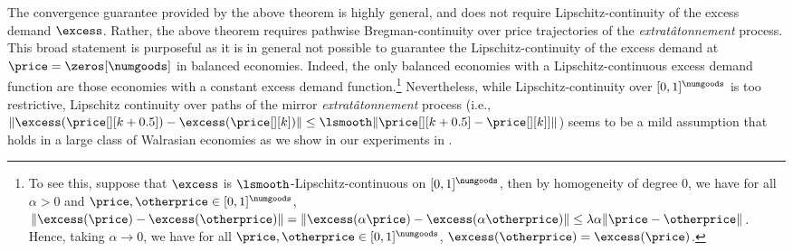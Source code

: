 The convergence guarantee provided by the above theorem is highly general, and does not require Lipschitz-continuity of the excess demand $\excess$. Rather, the above theorem requires pathwise Bregman-continuity over price trajectories of the \emph{extrat\^atonnement} process. This broad statement is purposeful as it is in general not possible to guarantee the Lipschitz-continuity of the excess demand at $\price = \zeros[\numgoods]$ in balanced economies. Indeed, the only balanced economies with a Lipschitz-continuous excess demand function are those economies with a constant excess demand function.\footnote{To see this, suppose that $\excess$ is $\lsmooth$-Lipschitz-continuous on $[0, 1]^\numgoods$, then by homogeneity of degree $0$, we have for all $\alpha > 0$ and $\price, \otherprice \in [0, 1]^\numgoods$, $\|\excess(\price) - \excess(\otherprice) \| = \| \excess(\alpha\price) - \excess(\alpha \otherprice)\| \leq \lambda \alpha \| \price - \otherprice \|$.
Hence, taking $\alpha \to 0$, we have for all  $\price, \otherprice \in [0, 1]^\numgoods$, $\excess(\otherprice) = \excess(\price)$.} 
Nevertheless, while Lipschitz-continuity over $[0, 1]^\numgoods$ is too restrictive, Lipschitz continuity over paths of the mirror \emph{extrat\^atonnement} process (i.e., $\|\excess(\price[][k+0.5]) - \excess(\price[][k])\| \leq \lsmooth \|\price[][k+0.5] - \price[][k]] \|$)
seems to be a mild assumption that holds in a large class of Walrasian economies as we show in our experiments in . 

